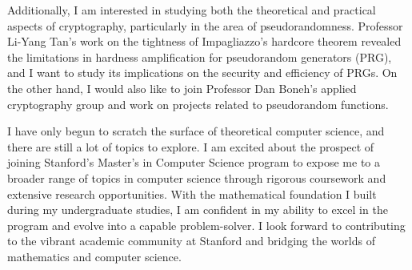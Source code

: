 \documentclass[12pt]{article}
\begin{document}
Additionally, I am interested in studying both the theoretical and practical aspects of cryptography,
particularly in the area of pseudorandomness. Professor Li-Yang Tan's work on the tightness of
Impagliazzo's hardcore theorem \cite{blanc2024samplecomplexitysmoothboosting} revealed the
limitations in hardness amplification for pseudorandom generators (PRG), and I want to study its
implications on the security and efficiency of PRGs. On the other hand, I would also like to join
Professor Dan Boneh's applied cryptography group and work on projects related to pseudorandom
functions.

I have only begun to scratch the surface of theoretical computer science, and there are still a lot
of topics to explore. I am excited about the prospect of joining Stanford's Master's in Computer
Science program to expose me to a broader range of topics in computer science through rigorous
coursework and extensive research opportunities. With the mathematical foundation I built during my
undergraduate studies, I am confident in my ability to excel in the program and evolve into a
capable problem-solver. I look forward to contributing to the vibrant academic community at Stanford
and bridging the worlds of mathematics and computer science.

\newpage



\end{document}
